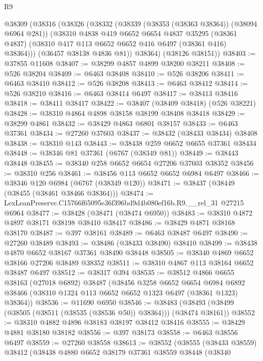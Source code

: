 \begin{lexlean}{R9}
\begin{coremodule}
    @38309
      (@38316
        (@38326
          (@38332
            (@38339 (@38353 (@38363 @38364)) (@38094 @6964 @281))
            (@38310
              @4838
              @419
              @6652
              @6654
              @4837
              @35295
              (@38361 @4837)
              (@38310 @417 @113 @6652 @6652 @416 @6497 (@38361 @416) @38364)))
          (@36457 @38138 @4836 @81))
        @38364)
      (@38126 @38151))
@38403 := @37855 @11608
@38407 := @38299 @4857 @4899 @38200 @38211
@38408 := @526 @38204
@38409 := @6463 @38408
@38410 := @526 @38206
@38411 := @6463 @38410
@38412 := @526 @38208
@38413 := @6463 @38412
@38414 := @526 @38210
@38416 := @6463 @38414 @6497
@38417 := @38413 @38416
@38418 := @38411 @38417
@38422 := @38407 (@38409 @38418) (@526 @38221)
@38428 := @38310 @4864 @4898 @38158 @38199 @38408 @38418
@38429 := @38299 @4861
@38432 := @38429 @4863 @6801 @38157
@38433 := @6463 @37361
@38434 := @27260 @37603
@38437 := @38432 (@38433 @38434) @38408
@38438 := @38310 @143
@38443 := @38438 @259 @6652 @6655 @37361 @38434
@38448 := @38346 @81 @37361 (@6767 (@38349 @81))
@38449 := @38443 @38448
@38455 := @38340 @258 @6652 @6654 @27206 @37603 @38352
@38456 := @38310 @256
@38461 := @38456 @113 @6652 @6652 @6984 @6497
@38466 := @38346 @120 @6984 (@6767 (@38349 @120))
@38471 := @38437 (@38449 (@38455 (@38461 @38466 @38364)))
@38474 := LexLeanPreserve.C15766f65095e36f396bd9d4b080ef16b.R9.__rel_31 @27215 @6964
@38477 := @38428 (@38471 (@38474 @6950))
@38483 := @38310 @4872 @4897 @38171 @38198 @38410 @38417
@38486 := @38429 @4871 @38168 @38170
@38487 := @397 @38161
@38489 := @6463 @38487 @6497
@38490 := @27260 @38489
@38493 := @38486 (@38433 @38490) @38410
@38499 := @38438 @4870 @6652 @38167 @37361 @38490 @38448
@38505 := @38340 @4869 @6652 @38166 @27206 @38489 @38352
@38511 := @38310 @4867 @113 @38164 @6652 @38487 @6497
@38512 := @38317 @394
@38535 := @38512
    @4866
    @6655
    @38163
    (@27018 @6892)
    @38487
    (@38456
      @3258
      @6652
      @6654
      @6984
      @6892
      @38466
      (@38310 @1324 @113 @6652 @6652 @1323 @6497 (@38361 @1323) @38364))
@38536 := @11690 @6950
@38546 := @38483 (@38493 (@38499 (@38505 (@38511 (@38535 (@38536 @50)) @38364))) (@38474 @38161))
@38552 := @38310 @4882 @4896 @38183 @38197 @38412 @38416
@38555 := @38429 @4881 @38180 @38182
@38556 := @397 @38173
@38558 := @6463 @38556 @6497
@38559 := @27260 @38558
@38613 := @38552
    (@38555
      (@38433 @38559)
      @38412
      (@38438
        @4880
        @6652
        @38179
        @37361
        @38559
        @38448
        (@38340

\end{coremodule}
\end{lexlean}
